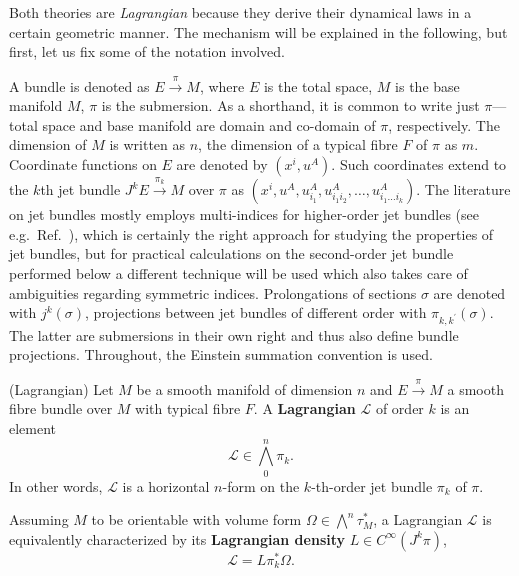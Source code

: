 Both theories are \emph{Lagrangian} because they derive their dynamical laws in a certain geometric manner. The mechanism will be explained in the following, but first, let us fix some of the notation involved.

A bundle is denoted as $E\overset{\pi}{\longrightarrow}M$, where $E$ is the total space, $M$ is the base manifold $M$, $\pi$ is the submersion. As a shorthand, it is common to write just $\pi$---total space and base manifold are domain and co-domain of $\pi$, respectively. The dimension of $M$ is written as $n$, the dimension of a typical fibre $F$ of $\pi$ as $m$. Coordinate functions on $E$ are denoted by $(x^i,u^A)$. Such coordinates extend to the $k$th jet bundle $J^kE \overset{\pi_k}{\longrightarrow}M$ over $\pi$ as $(x^i,\allowbreak u^A,\allowbreak u^A_{i_1},\allowbreak u^A_{i_1i_2},\allowbreak \dots,\allowbreak u^A_{i_1\dots i_k})$. The literature on jet bundles mostly employs multi-indices for higher-order jet bundles (see e.g.~Ref.~\cite{saunders}), which is certainly the right approach for studying the properties of jet bundles, but for practical calculations on the second-order jet bundle performed below a different technique will be used which also takes care of ambiguities regarding symmetric indices. Prolongations of sections $\sigma$ are denoted with $j^k(\sigma)$, projections between jet bundles of different order with $\pi_{k,k^\prime}(\sigma)$. The latter are submersions in their own right and thus also define bundle projections. Throughout, the Einstein summation convention is used.

\begin{definition}{(Lagrangian)}
  Let $M$ be a smooth manifold of dimension $n$ and $E \overset{\pi}{\longrightarrow} M$ a smooth fibre bundle over $M$ with typical fibre $F$. A \textbf{Lagrangian} $\mathcal L$ of order $k$ is an element
  \begin{equation}
    \mathcal L \in \textstyle\bigwedge^n_0\pi_k.
  \end{equation}
In other words, $\mathcal L$ is a horizontal $n$-form on the $k$-th-order jet bundle $\pi_k$ of $\pi$.

  Assuming $M$ to be orientable with volume form $\Omega\in\bigwedge^n\tau_M^\ast$, a Lagrangian $\mathcal L$ is equivalently characterized by its \textbf{Lagrangian density} $L\in C^\infty(J^k\pi)$,
  \begin{equation}\label{lagrangian_density}
  \mathcal L = L\pi_k^\ast\Omega.
\end{equation}
\end{definition}

